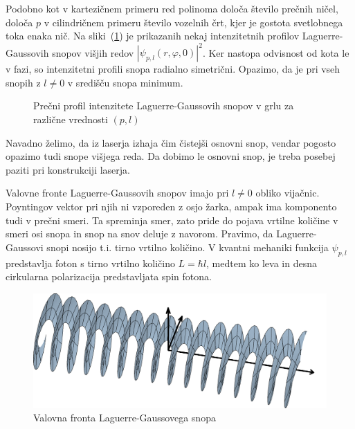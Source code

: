 Podobno kot v kartezičnem primeru red polinoma določa število prečnih ničel,
določa $p$ v cilindričnem primeru število vozelnih črt, kjer je gostota 
svetlobnega toka enaka nič. Na sliki~(\ref{fig:Laguerrovi_presek})
je prikazanih nekaj intenzitetnih profilov Laguerre-Gaussovih snopov
višjih redov $|\psi_{p,l}(r, \varphi, 0)|^2$. Ker nastopa  odvisnost od kota
le v fazi, so intenzitetni profili snopa radialno simetrični. Opazimo, da je pri  
vseh snopih z $l \ne 0$ v središču snopa minimum. 
\begin{figure}[h]
\centering
\def\svgwidth{110truemm} 

\caption{Prečni profil intenzitete Laguerre-Gaussovih snopov v grlu 
za različne vrednosti $(p,l)$}
\label{fig:Laguerrovi_presek}
\end{figure}

Navadno želimo, da iz laserja izhaja čim čistejši osnovni snop, vendar
pogosto opazimo tudi snope višjega reda. Da dobimo le osnovni
snop, je treba posebej paziti pri konstrukciji laserja.

\begin{remark}
Valovne fronte Laguerre-Gaussovih snopov imajo pri $l\ne0$  obliko vijačnic. 
Poyntingov vektor 
pri njih ni vzporeden z osjo žarka, ampak ima komponento tudi v prečni smeri. Ta spreminja smer, 
zato pride do pojava vrtilne količine v smeri osi snopa in snop na snov deluje z navorom. 
Pravimo, da Laguerre-Gaussovi snopi nosijo t.i. tirno vrtilno količino. 
V kvantni mehaniki funkcija $\psi_{p,l}$ predstavlja foton s tirno vrtilno količino $L = \hbar l$, 
medtem ko leva in desna cirkularna polarizacija predstavljata spin fotona. 
\begin{figure}[h]
\centering
\includegraphics[width=10truecm]{slike/03_Laguerre_faza.png}
\caption{Valovna fronta Laguerre-Gaussovega snopa}
\label{fig:Laguerrova_fronta}
\end{figure}
\end{remark}

